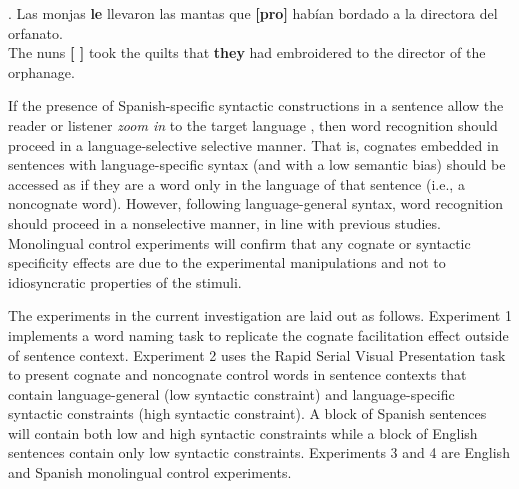 \ex.\label{lasmonjas2} Las monjas \textbf{le} llevaron las mantas que \textbf{[pro]} hab\'{i}an bordado a la directora del orfanato.\\
      The nuns \textbf{[ ]} took the quilts that \textbf{they} had embroidered to the director of the orphanage.

If the presence of Spanish-specific syntactic constructions in a sentence allow the reader or listener \textit{zoom in} to the target
language \parencite[e.g.,][]{Elston-Guttler2005}, then word recognition should proceed in a language-selective selective manner. That is, cognates
embedded in sentences with language-specific syntax (and with a low
semantic bias) should be accessed as if they are a word only in the
language of that sentence (i.e., a noncognate word). However, following language-general syntax, word recognition should proceed in a nonselective manner, in line with previous studies. Monolingual control experiments will confirm that any cognate or syntactic specificity effects are due to the experimental manipulations and not to idiosyncratic properties of the stimuli.

The experiments in the current investigation are laid out as follows. Experiment 1 implements a word naming task to replicate the cognate facilitation effect outside of sentence context. Experiment 2 uses the Rapid Serial Visual Presentation task to present cognate and noncognate control words in sentence contexts that contain language-general (low syntactic constraint) and language-specific syntactic constraints (high syntactic constraint). A block of Spanish sentences will contain both low and high syntactic constraints while a block of English sentences contain only low syntactic constraints. Experiments 3 and 4 are English and Spanish monolingual control experiments.  

